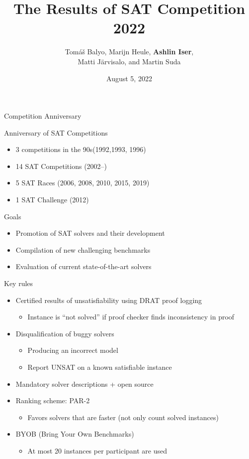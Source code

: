 \documentclass{beamer}
\title[SAT Competition 2022]{The Results of SAT Competition 2022}
\author[Balyo, Heule, Iser, J\"{a}rvisalo, Suda] {Tom{\'a}{\v s} Balyo, Marijn Heule,
{\bf Ashlin Iser},\\ Matti J\"{a}rvisalo, and Martin Suda}
\institute[] %
{
SAT 2022 Conference, Haifa (Israel) \\ %
}
\date{August 5, 2022} %
\begin{document}
\begin{frame}
\titlepage %
\end{frame}

\begin{frame}{Competition Anniversary}

\begin{block}{Anniversary of SAT Competitions}
\begin{itemize}
\item 3 competitions in the 90s\hfill (1992,1993, 1996)
\item 14 SAT Competitions \hfill (2002--)
\item 5 SAT Races \hfill (2006, 2008, 2010, 2015, 2019)
\item 1 SAT Challenge \hfill (2012)
\end{itemize}
\end{block}

\bigskip

\begin{block}{Goals}
\begin{itemize}
\item Promotion of SAT solvers and their development
\item Compilation of new challenging benchmarks
\item Evaluation of current state-of-the-art solvers
\end{itemize}
\end{block}

\end{frame}


\begin{frame}{Key rules}
\begin{itemize}
\item Certified results of unsatisfiability using DRAT proof logging
  \begin{itemize}
  \item Instance is ``not solved'' if proof checker finds inconsistency in proof
  \end{itemize}
\medskip
\item Disqualification of buggy solvers
  \begin{itemize}
  \item Producing an incorrect model
  \item Report UNSAT on a known satisfiable instance
  \end{itemize}
\medskip
\item Mandatory solver descriptions + open source
\medskip
\item Ranking scheme: PAR-2
\begin{itemize}
\item Favors solvers that are faster (not only count solved instances)
\end{itemize}
\medskip
\item BYOB (Bring Your Own Benchmarks)
\begin{itemize}
\item At most 20 instances per participant are used
\end{itemize} 
\end{itemize}
\end{frame}
\end{document}

